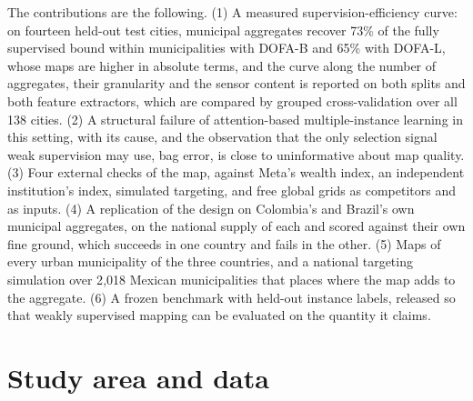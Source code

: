 \documentclass[11pt]{article}
\begin{document}
The contributions are the following. (1) A measured supervision-efficiency curve: on
fourteen held-out test cities, municipal aggregates recover 73\% of the fully
supervised bound within municipalities with DOFA-B and 65\% with DOFA-L, whose maps are
higher in absolute terms, and the curve along the number of aggregates, their
granularity and the sensor content is reported on both splits and both feature
extractors, which are compared by grouped cross-validation over all 138 cities. (2) A structural
failure of attention-based multiple-instance learning in this setting, with its cause,
and the observation that the only selection signal weak supervision may use, bag error,
is close to uninformative about map quality. (3) Four external checks of the map, against
Meta's wealth index, an independent institution's index, simulated targeting, and free
global grids as competitors and as inputs. (4) A replication of the design on Colombia's
and Brazil's own municipal aggregates, on the national supply of each and scored against
their own fine ground, which succeeds in one country and fails in the other. (5) Maps of
every urban municipality of the three countries, and a national targeting simulation
over 2{,}018 Mexican municipalities that places where the map adds to the aggregate.
(6) A frozen benchmark with held-out instance labels, released so that weakly
supervised mapping can be evaluated on the quantity it claims.

\section{Study area and data}
\end{document}
